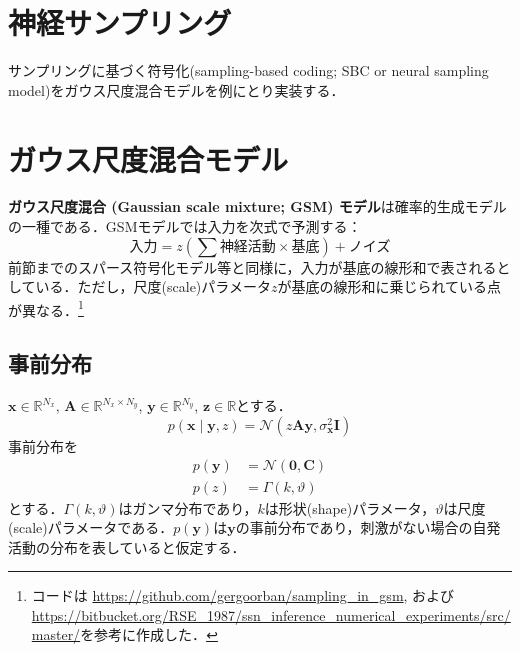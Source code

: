 \section{神経サンプリング}
サンプリングに基づく符号化(sampling-based coding; SBC or neural sampling model)をガウス尺度混合モデルを例にとり実装する．
\section{ガウス尺度混合モデル}
\textbf{ガウス尺度混合 (Gaussian scale mixture; GSM) モデル}は確率的生成モデルの一種である\citep{Wainwright1999-cl}\citep{Orban2016-tm}．GSMモデルでは入力を次式で予測する：
\begin{equation}
\text{入力}={z}\left(\sum \text{神経活動} \times \text{基底} \right) + \text{ノイズ}
\end{equation}
前節までのスパース符号化モデル等と同様に，入力が基底の線形和で表されるとしている．ただし，尺度(scale)パラメータ$z$が基底の線形和に乗じられている点が異なる．\footnote{コードは\citep{Orban2016-tm} \url{https://github.com/gergoorban/sampling_in_gsm}, および\citep{Echeveste2020-sh} \url{https://bitbucket.org/RSE_1987/ssn_inference_numerical_experiments/src/master/}を参考に作成した．}
\subsection{事前分布}
$\mathbf{x} \in \mathbb{R}^{N_x}$, $\mathbf{A} \in \mathbb{R}^{N_x\times N_y}$, $\mathbf{y} \in \mathbb{R}^{N_y}$, $\mathbf{z} \in \mathbb{R}$とする．
\begin{equation}
p\left(\mathbf{x}\mid\mathbf{y}, z\right)=\mathcal{N}\left(z \mathbf{A} \mathbf{y}, \sigma_{\mathbf{x}}^{2} \mathbf{I}\right)
\end{equation}
事前分布を
\begin{align}
p\left(\mathbf{y}\right)&=\mathcal{N}\left(\mathbf{0}, \mathbf{C}\right)\\
p\left(z\right)&=\Gamma (k, \vartheta)
\end{align}
とする．$\Gamma(k, \vartheta)$はガンマ分布であり，$k$は形状(shape)パラメータ，$\vartheta$は尺度(scale)パラメータである．$p\left(\mathbf{y}\right)$は$\mathbf{y}$の事前分布であり，刺激がない場合の自発活動の分布を表していると仮定する．
